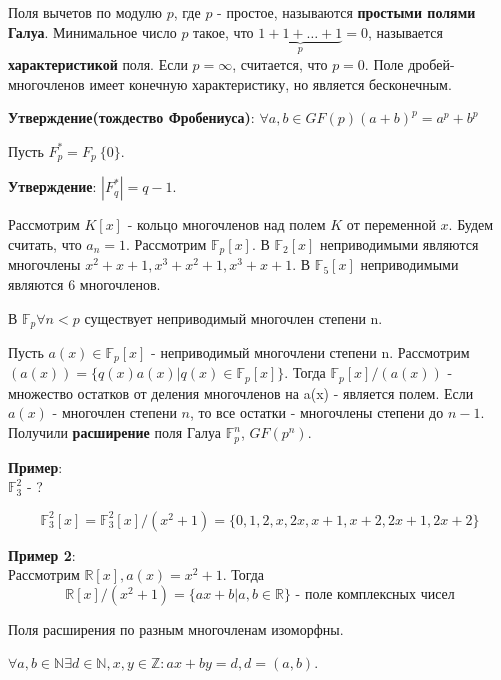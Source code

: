 \documentclass[11pt]{article}
\newcounter{th}\setcounter{th}{0}
\def\th{\par\smallskip\refstepcounter{th}\textbf{\arabic{th}}}
\newtheorem*{Theorem}{Теорема \th}
\begin{document}
Поля вычетов по модулю \(p\), где \(p\) - простое, называются \textbf{простыми полями Галуа}. Минимальное
число \(p\) такое, что \(\underbrace{1 + 1 + \ldots + 1}_{p} = 0\), называется \textbf{характеристикой} поля.
Если \(p = \infty\), считается, что \(p = 0\). Поле дробей-многочленов имеет конечную характеристику,
но является бесконечным.

\textbf{Утверждение(тождество Фробениуса)}: \(\forall a, b \in GF(p) (a + b)^p = a^p + b^p\)

Пусть \(F^*_p = F_p \ \{0\}\).

\textbf{Утверждение}: \(|F^*_q| = q - 1\).

Рассмотрим \(K[x]\) -  кольцо многочленов над полем \(K\) от переменной \(x\). Будем считать, что \(a_n = 1\).
Рассмотрим \(\mathbb{F}_p[x]\).
В \(\mathbb{F}_2[x]\) неприводимыми являются многочлены \(x^2 + x + 1, x^3 + x^2 + 1, x^3 + x + 1\).
В \(\mathbb{F}_5[x]\) неприводимыми являются 6 многочленов.
\begin{Theorem}
В $\mathbb{F}_p \forall n < p$ существует неприводимый многочлен степени n.
\end{Theorem}
Пусть $a(x) \in \mathbb{F}_p[x]$ - неприводимый многочлени степени n. Рассмотрим
$(a(x)) = \{q(x)a(x) | q(x) \in \mathbb{F}_p[x]\}$. Тогда $\mathbb{F}_p[x] / (a(x))$ - множество
остатков от деления многочленов на a(x) - является полем. Если $a(x)$ - многочлен степени $n$, то
все остатки - многочлены степени до $n - 1$. Получили \textbf{расширение} поля Галуа $\mathbb{F}_p^n$,
$GF(p^n)$.

\textbf{Пример}:\\
$\mathbb{F}_3^2$ - ?

\begin{equation}
\mathbb{F}_3^2[x] = \mathbb{F}_3^2[x]/(x^2 + 1) = \{0, 1, 2, x, 2x, x + 1, x + 2, 2x + 1, 2x + 2\}
\end{equation}

\textbf{Пример 2}:\\
Рассмотрим $\mathbb{R}[x], a(x) = x^2 + 1$. Тогда
\begin{equation}
\mathbb{R}[x]/(x^2 + 1) = \{ax + b | a, b \in \mathbb{R}\} \text{ - поле комплексных чисел}
\end{equation}
\begin{Theorem}
Поля расширения по разным многочленам изоморфны.
\end{Theorem}
\begin{Theorem}
$\forall a, b \in \mathbb{N} \exists d \in \mathbb{N}, x, y \in \mathbb{Z}: ax + by = d, d = (a, b)$.
\end{Theorem}
\end{document}
